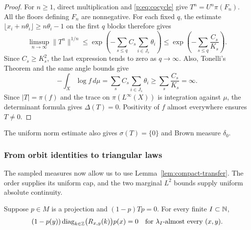 \begin{proof}
For $n\geq1$, direct multiplication and \eqref{p:eq:cocycle} give
$T^n=U^n\pi(F_n)$. All the floors defining $F_n$ are nonnegative.
For each fixed $q$, the estimate
$\lfloor x_i+n\theta_i\rfloor\geq n\theta_i-1$ on the first
$q$ blocks therefore gives
\[
 \limsup_{n\to\infty}\|T^n\|^{1/n}
 \leq \exp\!\left(-\sum_{s\leq q}C_s
                              \sum_{i\in J_s}\theta_i\right)
 \leq \exp\!\left(-\sum_{s\leq q}\frac{C_s}{K_s}\right).
\]
Since $C_s\geq K_s^2$, the last expression tends to zero as
$q\to\infty$.
Also, Tonelli's Theorem and the same angle bounds give
\[
 -\int_X\log f\,d\mu
 =\sum_s C_s\sum_{i\in J_s}\theta_i
 \ge\sum_s\frac{C_s}{K_s}=\infty.
\]
Since $|T|=\pi(f)$ and the trace on $\pi(L^\infty(X))$ is integration
against $\mu$, the determinant formula gives $\Delta(T)=0$.
Positivity of $f$ almost everywhere ensures $T\ne0$.
\end{proof}

The uniform norm estimate also gives $\sigma(T)=\{0\}$ and Brown
measure $\delta_0$.

\subsubsection*{From orbit identities to triangular laws}
The sampled measures now allow us to use
Lemma~\ref{lem:compact-transfer}. The order supplies its uniform cap,
and the two marginal $L^2$ bounds supply uniform absolute continuity.

\begin{proposition}\label{p:prop:pair-identity}
Suppose $p\in M$ is a projection and $(1-p)Tp=0$. For every finite
$I\subset\mathbb N$,
\begin{equation}\label{p:eq:pair-identity}
 (1-p(y))\operatorname{diag}_{k\in\mathbb Z}\bigl(R_{x,y}(k)\bigr)p(x)=0
 \quad\text{for }\lambda_I\text{-almost every }(x,y).
\end{equation}
\end{proposition}


